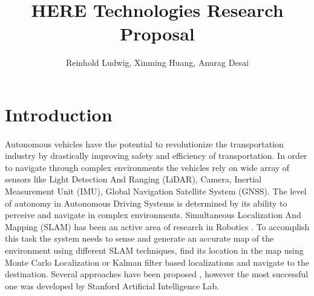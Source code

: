 \documentclass{article}
\title{HERE Technologies Research Proposal}
\author{Reinhold Ludwig, Xinming Huang, Anurag Desai}
\begin{document}
	\maketitle
	\newpage
	

	
	\section{Introduction}
	\paragraph{}
	Autonomous vehicles have the potential to revolutionize the transportation industry by drastically improving safety and efficiency of transportation. In order to navigate through complex environments the vehicles rely on wide array of sensors like Light Detection And Ranging (LiDAR), Camera, Inertial Measurement Unit (IMU), Global Navigation Satellite System (GNSS). The level of autonomy in Autonomous Driving Systems is determined by its ability to perceive and navigate in complex environments. Simultaneous Localization And Mapping (SLAM) has been an active area of research in Robotics
	\cite{durrant-whyte_simultaneous_nodate}
	\cite{bailey_simultaneous_2006}.
	To accomplish this task the system needs to sense and generate an accurate map of the environment using different SLAM techniques, find its location in the map using Monte Carlo Localization
	\cite{thrun_robust_2001}
	or Kalman filter based localizations 
	and navigate to the destination. Several approaches have been proposed 
	\cite{durrant-whyte_simultaneous_nodate}
	\cite{thrun_graph_2006},
	however the most successful one
	\cite{levinson_map-based_2007}
	was developed by Stanford Artificial Intelligence Lab. 
	
\end{document}
